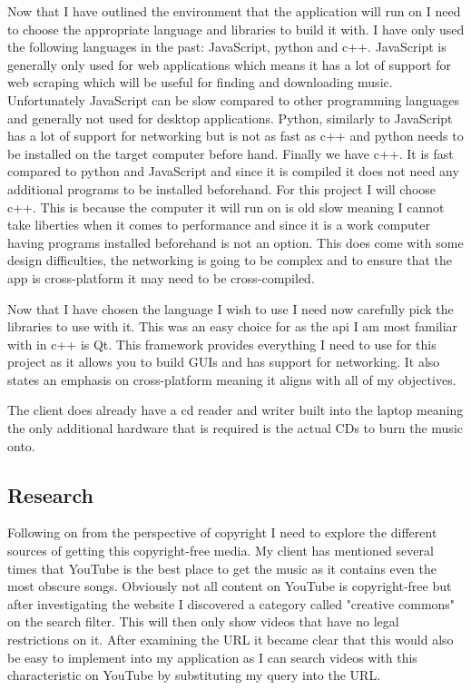 \documentclass{article}
\begin{document}
Now that I have outlined the environment that the application will run on I need to choose
the appropriate language and libraries to build it with. I have only used the following
languages in the past: JavaScript, python and c++. JavaScript is generally only used
for web applications which means it has a lot of support for web scraping which will
be useful for finding and downloading music. Unfortunately JavaScript can be slow
compared to other programming languages and generally not used for desktop applications.
Python, similarly to JavaScript has a lot of support for networking but is not as fast
as c++ and python needs to be installed on the target computer before hand. Finally
we have c++. It is fast compared to python and JavaScript and since it is compiled
it does not need any additional programs to be installed beforehand. For this project
I will choose c++. This is because the computer it will run on is old slow meaning I
cannot take liberties when it comes to performance and since it is a work computer
having programs installed beforehand is not an option. This does come with some
design difficulties, the networking is going to be complex and to ensure that
the app is cross-platform it may need to be cross-compiled.

Now that I have chosen the language I wish to use I need now carefully pick
the libraries to use with it. This was an easy choice for as the api I am
most familiar with in c++ is Qt. This framework provides everything I need
to use for this project as it allows you to build GUIs and has support for networking.
It also states an emphasis on cross-platform meaning it aligns with all of my
objectives.

The client does already have a cd reader and writer built into the laptop meaning the only
additional hardware that is required is the actual CDs to burn the music onto.
\subsection{Research}\label{research}
Following on from the perspective of copyright I need to explore the different
sources of getting this copyright-free media. My client has mentioned several
times that YouTube is the best place to get the music as it contains even
the most obscure songs. Obviously not all content on YouTube is copyright-free
but after investigating the website I discovered a category called "creative
commons" on the search filter. This will then only show videos that have no
legal restrictions on it. After examining the URL it became clear that this
would also be easy to implement into my application as I can search
videos with this characteristic on YouTube by substituting my query into the
URL.
\end{document}
